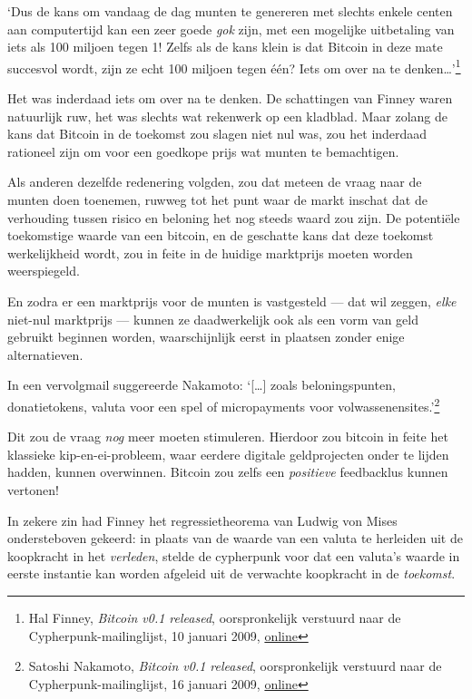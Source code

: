 \documentclass[
  a5paper,
  smalldemyvopaper,11pt,twoside,onecolumn,openright,extrafontsizes,
hidelinks]{memoir}
\begin{document}
`Dus de kans om vandaag de dag munten te genereren met slechts enkele
centen aan computertijd kan een zeer goede \emph{gok} zijn, met een
mogelijke uitbetaling van iets als 100 miljoen tegen 1! Zelfs als de
kans klein is dat Bitcoin in deze mate succesvol wordt, zijn ze echt 100
miljoen tegen één? Iets om over na te denken\ldots{}'\footnote{Hal
  Finney, \emph{Bitcoin v0.1 released}, oorspronkelijk verstuurd naar de
  Cypherpunk-mailinglijst, 10 januari 2009,
  \href{https://www.metzdowd.com/pipermail/cryptography/2009-January/015004.html}{online}}

Het was inderdaad iets om over na te denken. De schattingen van Finney
waren natuurlijk ruw, het was slechts wat rekenwerk op een kladblad.
Maar zolang de kans dat Bitcoin in de toekomst zou slagen niet nul was,
zou het inderdaad rationeel zijn om voor een goedkope prijs wat munten
te bemachtigen.

Als anderen dezelfde redenering volgden, zou dat meteen de vraag naar de
munten doen toenemen, ruwweg tot het punt waar de markt inschat dat de
verhouding tussen risico en beloning het nog steeds waard zou zijn. De
potentiële toekomstige waarde van een bitcoin, en de geschatte kans dat
deze toekomst werkelijkheid wordt, zou in feite in de huidige marktprijs
moeten worden weerspiegeld.

En zodra er een marktprijs voor de munten is vastgesteld --- dat wil
zeggen, \emph{elke} niet-nul marktprijs --- kunnen ze daadwerkelijk ook
als een vorm van geld gebruikt beginnen worden, waarschijnlijk eerst in
plaatsen zonder enige alternatieven.

In een vervolgmail suggereerde Nakamoto: `{[}\ldots{]} zoals
beloningspunten, donatietokens, valuta voor een spel of micropayments
voor volwassenensites.'\footnote{Satoshi Nakamoto, \emph{Bitcoin v0.1
  released}, oorspronkelijk verstuurd naar de Cypherpunk-mailinglijst,
  16 januari 2009,
  \href{https://www.metzdowd.com/pipermail/cryptography/2009-January/015014.html}{online}}

Dit zou de vraag \emph{nog} meer moeten stimuleren. Hierdoor zou bitcoin
in feite het klassieke kip-en-ei-probleem, waar eerdere digitale
geldprojecten onder te lijden hadden, kunnen overwinnen. Bitcoin zou
zelfs een \emph{positieve} feedbacklus kunnen vertonen!

In zekere zin had Finney het regressietheorema van Ludwig von Mises
ondersteboven gekeerd: in plaats van de waarde van een valuta te
herleiden uit de koopkracht in het \emph{verleden}, stelde de cypherpunk
voor dat een valuta's waarde in eerste instantie kan worden afgeleid uit
de verwachte koopkracht in de \emph{toekomst}.
\end{document}
